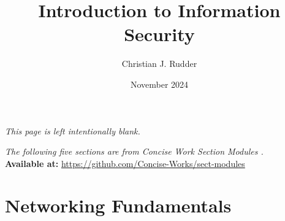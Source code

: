 \documentclass{memoir}
\title{Introduction to Information Security}
\author{Christian J. Rudder}
\date{November 2024}
\begin{document}
\maketitle
\setcounter{tocdepth}{2}

\tableofcontents

\newpage
\thispagestyle{empty}
\mbox{}
\vfill
\begin{center}
    \textit{This page is left intentionally blank.}
\end{center}
\vfill
\newpage
\thispagestyle{empty}
\mbox{}
\vfill
\begin{center}
    \textit{The following five sections are from Concise Work Section Modules \cite{concise_works_modules}.}\\
    \textbf{Available at:} \url{https://github.com/Concise-Works/sect-modules}
\end{center}
\vfill

% 
% 
% 
% 

\chapter{Networking Fundamentals}



\end{document}
